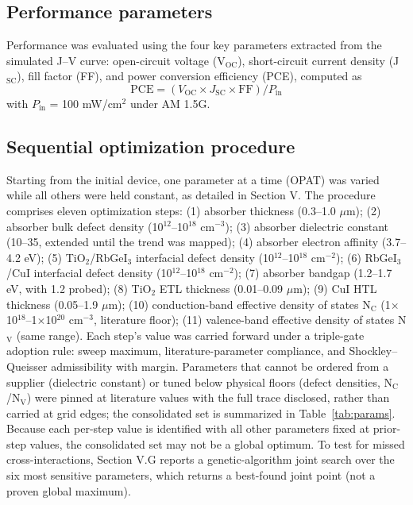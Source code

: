 \documentclass[aip,amsmath,amssymb,preprint]{revtex4-2}
\begin{document}
\subsection{Performance parameters}
Performance was evaluated using the four key parameters extracted from the simulated J--V curve: open-circuit voltage (V$_{\mathrm{OC}}$), short-circuit current density (J$_{\mathrm{SC}}$), fill factor (FF), and power conversion efficiency (PCE), computed as
\begin{equation}\label{eq:pce}
\mathrm{PCE} = (V_{\mathrm{OC}} \times J_{\mathrm{SC}} \times \mathrm{FF})/P_{\mathrm{in}}
\end{equation}
with $P_{\mathrm{in}}$ = 100 mW/cm$^{2}$ under AM 1.5G.

\subsection{Sequential optimization procedure}
Starting from the initial device, one parameter at a time (OPAT) was varied while all others were held constant, as detailed in Section V.
The procedure comprises eleven optimization steps: (1) absorber thickness (0.3--1.0 $\mu$m); (2) absorber bulk defect density (10$^{12}$--10$^{18}$ cm$^{-3}$); (3) absorber dielectric constant (10--35, extended until the trend was mapped); (4) absorber electron affinity (3.7--4.2 eV); (5) TiO$_{2}$/RbGeI$_{3}$ interfacial defect density (10$^{12}$--10$^{18}$ cm$^{-2}$); (6) RbGeI$_{3}$/CuI interfacial defect density (10$^{12}$--10$^{18}$ cm$^{-2}$); (7) absorber bandgap (1.2--1.7 eV, with 1.2 probed); (8) TiO$_{2}$ ETL thickness (0.01--0.09 $\mu$m); (9) CuI HTL thickness (0.05--1.9 $\mu$m); (10) conduction-band effective density of states N$_{\mathrm{C}}$ (1$\times$10$^{18}$--1$\times$10$^{20}$ cm$^{-3}$, literature floor); (11) valence-band effective density of states N$_{\mathrm{V}}$ (same range). Each step's value was carried forward under a triple-gate adoption rule: sweep maximum, literature-parameter compliance, and Shockley--Queisser admissibility with margin. Parameters that cannot be ordered from a supplier (dielectric constant) or tuned below physical floors (defect densities, N$_{\mathrm{C}}$/N$_{\mathrm{V}}$) were pinned at literature values with the full trace disclosed, rather than carried at grid edges; the consolidated set is summarized in Table~\ref{tab:params}.
Because each per-step value is identified with all other parameters fixed at prior-step values, the consolidated set may not be a global optimum. To test for missed cross-interactions, Section V.G reports a genetic-algorithm joint search over the six most sensitive parameters, which returns a best-found joint point (not a proven global maximum).
\end{document}
